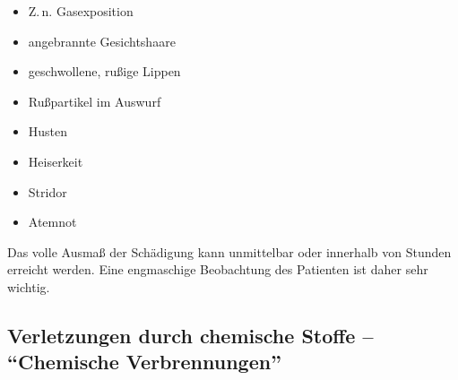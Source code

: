 \begin{itemize}
  \item Z.\,n. Gasexposition
  \item angebrannte Gesichtshaare
  \item geschwollene, rußige Lippen
  \item Rußpartikel im Auswurf
  \item Husten
  \item Heiserkeit
  \item Stridor
  \item Atemnot
\end{itemize}

Das volle Ausmaß der Schädigung kann unmittelbar oder
innerhalb von Stunden erreicht werden. Eine engmaschige
Beobachtung des Patienten ist daher sehr wichtig.











\subsection{Verletzungen durch chemische Stoffe -- "`Chemische Verbrennungen"'}
\label{topic:veraetzung-trauma}

